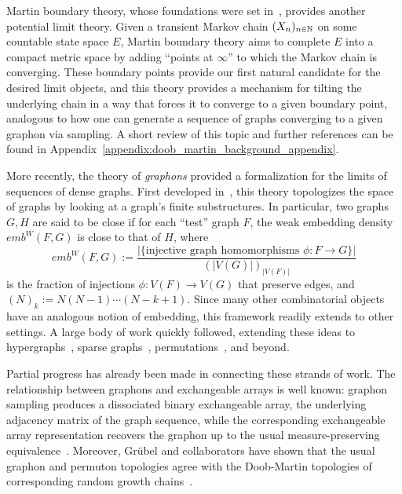 Martin boundary theory, whose foundations were set in~\cite{doob1959_discrete_potential_theory_boundaries},
provides another potential limit theory. Given a transient Markov chain $(X_n)_{n \in \mathbb{N}}$ on some
countable state space $E$, Martin boundary theory aims to complete $E$ into a compact metric space
by adding ``points at $\infty$'' to which the Markov chain is converging. These boundary points
provide our first natural candidate for the desired limit objects, and this theory
provides a mechanism for tilting the underlying chain in a way that forces it to converge to
a given boundary point, analogous to how one can generate a sequence of graphs converging to a given
graphon via sampling. A short review of this topic and further references can be found
in Appendix~\ref{appendix:doob_martin_background_appendix}.

More recently, the theory of \textit{graphons} provided
a formalization for the limits of sequences of dense graphs. First developed in~\cite{lovasz2004_limits_dense_graph_sequences, borgs2007_convergent_dense_graph_sequences},
this theory topologizes the space of graphs by looking at a graph's finite substructures. In particular, two
graphs $G,H$ are said to be close if for each ``test'' graph $F$, the weak embedding density $emb^W(F,G)$ is close to
that of $H$, where
%
    \[emb^W(F,G) :=
    \frac{|\{\text{injective graph homomorphisms }\phi:F\to G\}|}
    {(|V(G)|)_{|V(F)|}}\]
%
is the fraction of injections $\phi:V(F) \to V(G)$ that preserve edges, and
$(N)_k:=N(N-1)\cdots(N-k+1)$. Since many other
combinatorial objects have an analogous notion of embedding,
this framework readily extends to other settings. A large body of work quickly
followed, extending these ideas to hypergraphs~\cite{zhao2015_hypergraph_limits_regularity_approach, elek2012_measure_theoretic_dense_hypergraphs},
 sparse graphs~\cite{borgs2019_sampling_sparse_exchangeable_graphs}, permutations~\cite{HoppenEtAl2013PermutationLimits},
and beyond.

Partial progress has already been made in connecting these strands of work.
The relationship between graphons and exchangeable arrays is well known: graphon
sampling produces a dissociated binary exchangeable array, the underlying adjacency matrix
of the graph sequence, while the corresponding
exchangeable array representation recovers the graphon up to the usual measure-preserving
equivalence~\cite{austin2013_exchangeable_random_arrays,tao2007correspondence}.
Moreover, Gr\"ubel and collaborators have shown that the usual graphon and permuton topologies agree
with the Doob-Martin topologies of corresponding random growth
chains~\cite{grubel2015_persisting_randomness_graphs_search_trees,grubel2023_ranks_copulas_permutons}.

